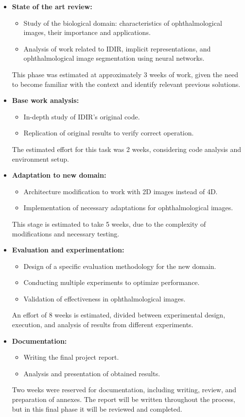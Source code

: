 \begin{itemize}
    \item \textbf{State of the art review:}
    \begin{itemize}
        \item Study of the biological domain: characteristics of ophthalmological images, their importance and applications.
        \item Analysis of work related to IDIR, implicit representations, and ophthalmological image segmentation using neural networks.
    \end{itemize}
    This phase was estimated at approximately 3 weeks of work, given the need to become familiar with the context and identify relevant previous solutions.

    \item \textbf{Base work analysis:}
    \begin{itemize}
        \item In-depth study of IDIR's original code.
        \item Replication of original results to verify correct operation.
    \end{itemize}
    The estimated effort for this task was 2 weeks, considering code analysis and environment setup.

    \item \textbf{Adaptation to new domain:}
    \begin{itemize}
        \item Architecture modification to work with 2D images instead of 4D.
        \item Implementation of necessary adaptations for ophthalmological images.
    \end{itemize}
    This stage is estimated to take 5 weeks, due to the complexity of modifications and necessary testing.

    \item \textbf{Evaluation and experimentation:}
    \begin{itemize}
        \item Design of a specific evaluation methodology for the new domain.
        \item Conducting multiple experiments to optimize performance.
        \item Validation of effectiveness in ophthalmological images.
    \end{itemize}
    An effort of 8 weeks is estimated, divided between experimental design, execution, and analysis of results from different experiments.

    \item \textbf{Documentation:}
    \begin{itemize}
        \item Writing the final project report.
        \item Analysis and presentation of obtained results.
    \end{itemize}
    Two weeks were reserved for documentation, including writing, review, and preparation of annexes. The report will be written throughout the process, but in this final phase it will be reviewed and completed.
\end{itemize}


